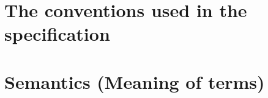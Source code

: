 \clearpage
\section{The conventions used in the specification}

\clearpage
\section{Semantics (Meaning of terms)}

